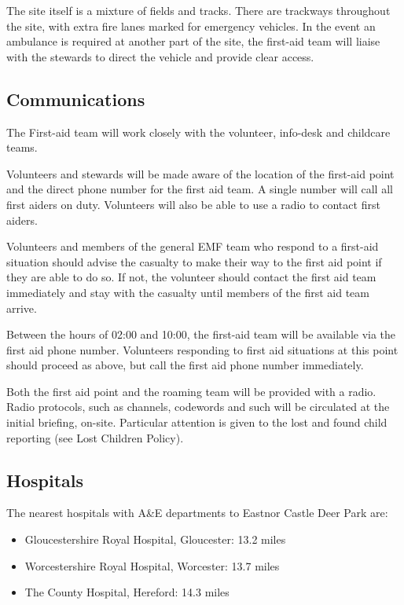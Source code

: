 The site itself is a mixture of fields and tracks. There are
trackways throughout the site, with extra fire lanes marked for emergency
vehicles. In the event an ambulance is required at another part of the site,
the first-aid team will liaise with the stewards to direct the vehicle and
provide clear access.

\subsection{Communications}

The First-aid team will work closely with the volunteer, info-desk and childcare
teams.

Volunteers and stewards will be made aware of the location of the first-aid
point and the direct phone number for the first aid team. A single number will 
call all first aiders on duty. Volunteers will also be able to use a radio to 
contact first aiders.

Volunteers and members of the general EMF team who respond to a first-aid
situation should advise the casualty to make their way to the first aid point
if they are able to do so. If not, the volunteer should contact the first aid
team immediately and stay with the casualty until members of the first aid team
arrive.

Between the hours of 02:00 and 10:00, the first-aid team will be available via the
first aid phone number. Volunteers responding to first aid situations at this
point should proceed as above, but call the first aid phone number
immediately.

Both the first aid point and the roaming team will be provided with a radio.
Radio protocols, such as channels, codewords and such will be circulated at the
initial briefing, on-site. Particular attention is given to the lost and found
child reporting (see Lost Children Policy).

\subsection{Hospitals}

The nearest hospitals with A\&E departments to Eastnor Castle Deer Park are:

\begin{itemize}
    \tightlist
\item Gloucestershire Royal Hospital, Gloucester: 13.2 miles
\item Worcestershire Royal Hospital, Worcester: 13.7 miles
\item The County Hospital, Hereford: 14.3 miles
\end{itemize}

